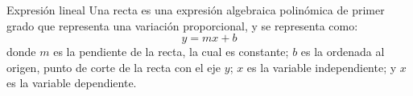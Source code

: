 \begin{infocard}{Expresión lineal}
    Una recta es una expresión algebraica polinómica de primer grado que representa una variación proporcional, y se representa como:
    \[y = mx + b\]
    donde $m$ es la pendiente de la recta, la cual es constante; $b$ es la ordenada al origen, punto de corte de la recta con el eje $y$;
    $x$ es la variable independiente; y $x$ es la variable dependiente.\\
\end{infocard}